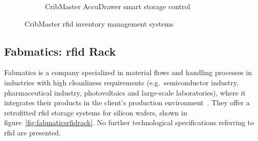 \begin{figure}[!ht]
\begin{subfigure}{.45\textwidth}
        \caption[CribMaster AccuDrawer smart storage control]{CribMaster AccuDrawer smart storage control~\cite{AccuDrawerCribmasterCom}} 
        \label{fig:cribmasteraccydrawer}
    \end{subfigure}
    \caption[CribMaster \ac{rfid} inventory management systems]{CribMaster \ac{rfid} inventory management systems} 
    \label{fig:cribmaster}
\end{figure}

\subsection{Fabmatics: \ac{rfid} Rack}

Fabmatics is a company specialized in material flows and handling processes in industries with high cleanliness requirements (e.g.\ semiconductor industry, pharmaceutical industry, photovoltaics and large-scale laboratories), where it integrates their products in the client's production environment~\cite{RFIDRackFabmatics}.
They offer a retrofitted \ac{rfid} storage systems for silicon wafers, shown in figure~\ref{fig:fabmaticsrfidrack}.
No further technological specifications referring to \ac{rfid} are presented.


